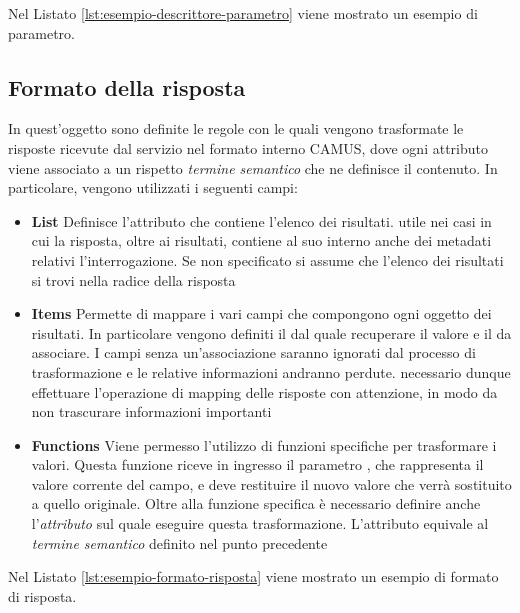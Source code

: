 Nel Listato \ref{lst:esempio-descrittore-parametro} viene mostrato un esempio di parametro.



\subsection{Formato della risposta\label{sec:descrittore-risposta}}

In quest'oggetto sono definite le regole con le quali vengono trasformate le risposte ricevute dal servizio nel formato interno CAMUS, dove ogni attributo viene associato a un rispetto \emph{termine semantico} che ne definisce il contenuto. In particolare, vengono utilizzati i seguenti campi:

\begin{itemize}
	\item \textbf{List} Definisce l'attributo che contiene l'elenco dei risultati. \upe utile nei casi in cui la risposta, oltre ai risultati, contiene al suo interno anche dei metadati relativi l'interrogazione. Se non specificato si assume che l'elenco dei risultati si trovi nella radice della risposta
	\item \textbf{Items} Permette di mappare i vari campi che compongono ogni oggetto dei risultati. In particolare vengono definiti il  dal quale recuperare il valore e il  da associare. I campi senza un'associazione saranno ignorati dal processo di trasformazione e le relative informazioni andranno perdute. \upe necessario dunque effettuare l'operazione di mapping delle risposte con attenzione, in modo da non trascurare informazioni importanti
	\item \textbf{Functions} Viene permesso l'utilizzo di funzioni specifiche per trasformare i valori. Questa funzione riceve in ingresso il parametro , che rappresenta il valore corrente del campo, e deve restituire il nuovo valore che verrà sostituito a quello originale. Oltre alla funzione specifica è necessario definire anche l'\emph{attributo} sul quale eseguire questa trasformazione. L'attributo equivale al \emph{termine semantico} definito nel punto precedente
\end{itemize}

Nel Listato \ref{lst:esempio-formato-risposta} viene mostrato un esempio di formato di risposta.


